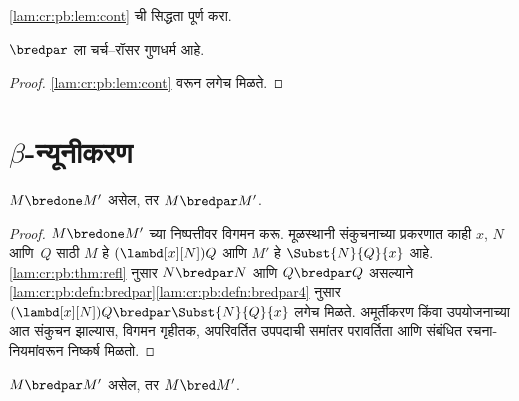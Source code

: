 \begin{prob}
  \ref{lam:cr:pb:lem:cont} ची सिद्धता पूर्ण करा.
\end{prob}

\begin{thm}\label{lam:cr:pb:thm:cr}
  $\bredpar$ ला चर्च–रॉसर गुणधर्म आहे.
\end{thm}

\begin{proof}
  \ref{lam:cr:pb:lem:cont} वरून लगेच मिळते.
\end{proof}












\section{$\beta$-न्यूनीकरण}\label{lam:cr:b:sec}

\begin{lem}\label{lam:cr:b:lem:one-par}
  $M \bredone M'$ असेल, तर $M \bredpar M'$.
\end{lem}
\begin{proof} $M \bredone M'$ च्या निष्पत्तीवर विगमन करू.
  मूळस्थानी संकुचनाच्या प्रकरणात काही $x$, $N$ आणि~$Q$ साठी
  $M$ हे $(\lambd[x][N])Q$ आणि $M'$ हे
  $\Subst{N}{Q}{x}$ आहे. \ref{lam:cr:pb:thm:refl} नुसार
  $N \bredpar N$ आणि $Q \bredpar Q$ असल्याने
  \ref{lam:cr:pb:defn:bredpar}\ref{lam:cr:pb:defn:bredpar4} नुसार
  $(\lambd[x][N])Q \bredpar \Subst{N}{Q}{x}$ लगेच मिळते.
  अमूर्तीकरण किंवा उपयोजनाच्या आत संकुचन झाल्यास,
  विगमन गृहीतक, अपरिवर्तित उपपदाची समांतर परावर्तिता
  आणि संबंधित रचना-नियमांवरून निष्कर्ष मिळतो.
\end{proof}

\begin{lem}\label{lam:cr:b:lem:par-red}
  $M \bredpar M'$ असेल, तर $M \bred M'$.
\end{lem}

